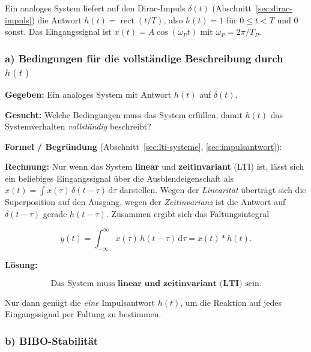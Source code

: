 Ein analoges System liefert auf den Dirac-Impuls $\delta(t)$
(Abschnitt~\ref{sec:dirac-impuls}) die Antwort
$h(t) = \operatorname{rect}(t/T)$, also $h(t) = 1$ für $0 \leq t < T$ und $0$
sonst. Das Eingangssignal ist $x(t) = A\cos(\omega_P t)$ mit
$\omega_P = 2\pi/T_P$.

\subsubsection*{a) Bedingungen für die vollständige Beschreibung durch $h(t)$}

\begin{beispiel}

\textbf{Gegeben:} Ein analoges System mit Antwort $h(t)$ auf $\delta(t)$.

\textbf{Gesucht:} Welche Bedingungen muss das System erfüllen, damit $h(t)$ das
Systemverhalten \emph{vollständig} beschreibt?

\textbf{Formel / Begründung} (Abschnitt~\ref{sec:lti-systeme},
\ref{sec:impulsantwort}):

\textbf{Rechnung:} Nur wenn das System \textbf{linear} und \textbf{zeitinvariant}
(LTI) ist, lässt sich ein beliebiges Eingangssignal über die Ausblendeigenschaft
als $x(t) = \int x(\tau)\,\delta(t - \tau)\,\mathrm{d}\tau$ darstellen. Wegen der
\emph{Linearität} überträgt sich die Superposition auf den Ausgang, wegen der
\emph{Zeitinvarianz} ist die Antwort auf $\delta(t - \tau)$ gerade
$h(t - \tau)$. Zusammen ergibt sich das Faltungsintegral

$$
y(t) = \int_{-\infty}^{\infty} x(\tau)\, h(t - \tau)\,\mathrm{d}\tau = x(t) * h(t).
$$

\textbf{Lösung:}

$$
\boxed{\;\text{Das System muss } \textbf{linear und zeitinvariant (LTI)} \text{ sein.}\;}
$$

Nur dann genügt die \emph{eine} Impulsantwort $h(t)$, um die Reaktion auf jedes
Eingangssignal per Faltung zu bestimmen.

\end{beispiel}

\subsubsection*{b) BIBO-Stabilität}

